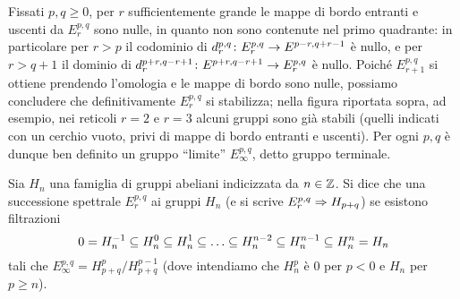 Fissati \(p,q\ge 0\), per \(r\) sufficientemente grande le mappe di bordo entranti e uscenti da \(E^{p,q}_r\) sono nulle, in quanto non sono contenute nel primo quadrante: in particolare per \(r>p\) il codominio di \(\map{d^{p,q}_r}{E^{p,q}_r}{E^{p-r,q+r-1}}\) è nullo, e per \(r>q+1\) il dominio di \(\map{d^{p+r,q-r+1}_r}{E^{p+r,q-r+1}}{E^{p,q}_r}\) è nullo. Poiché \(E^{p,q}_{r+1}\) si ottiene prendendo l'omologia e le mappe di bordo sono nulle, possiamo concludere che definitivamente \(E^{p,q}_r\) si stabilizza; nella figura riportata sopra, ad esempio, nei reticoli \(r=2\) e \(r=3\) alcuni gruppi sono già stabili (quelli indicati con un cerchio vuoto, privi di mappe di bordo entranti e uscenti). Per ogni \(p,q\) è dunque ben definito un gruppo \enquote{limite} \(E^{p,q}_\infty\), detto gruppo terminale. 

\begin{definition}
Sia \(H_n\) una famiglia di gruppi abeliani indicizzata da \(n\in\mathbb{Z}\). Si dice che una successione spettrale \(E^{p,q}_r\)  ai gruppi \(H_n\) (e si scrive \(E^{p,q}_r\Rightarrow H_{p+q}\)) se esistono filtrazioni
\[
0=H^{-1}_n\subseteq H^0_n\subseteq H^1_n\subseteq\ldots\subseteq H^{n-2}_n\subseteq H^{n-1}_n\subseteq H^n_n=H_n
\]
tali che \(E^{p,q}_\infty=H^p_{p+q}/H^{p-1}_{p+q}\) (dove intendiamo che \(H^p_n\) è \(0\) per \(p<0\) e \(H_n\) per \(p\ge n\)).
\end{definition}

